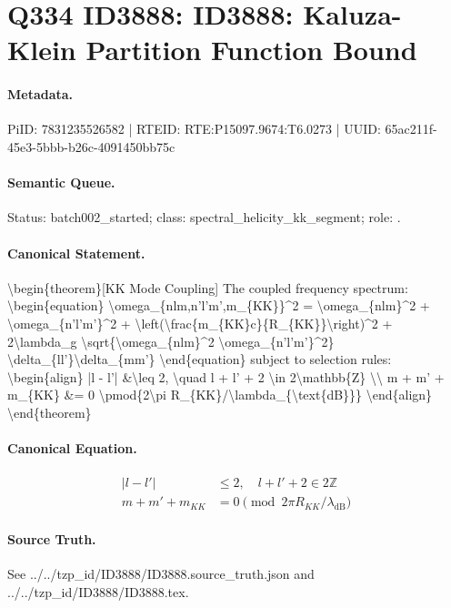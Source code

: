 \section*{Q334 ID3888: ID3888: Kaluza-Klein Partition Function Bound}
\paragraph{Metadata.}
PiID: 7831235526582 | RTEID: RTE:P15097.9674:T6.0273 | UUID: 65ac211f-45e3-5bbb-b26c-4091450bb75c

\paragraph{Semantic Queue.}
Status: batch002\_started; class: spectral\_helicity\_kk\_segment; role: .

\paragraph{Canonical Statement.}
\textbackslash{}begin\{theorem\}[KK Mode Coupling] The coupled frequency spectrum: \textbackslash{}begin\{equation\} \textbackslash{}omega\_\{nlm,n'l'm',m\_\{KK\}\}\textasciicircum{}2 = \textbackslash{}omega\_\{nlm\}\textasciicircum{}2 + \textbackslash{}omega\_\{n'l'm'\}\textasciicircum{}2 + \textbackslash{}left(\textbackslash{}frac\{m\_\{KK\}c\}\{R\_\{KK\}\}\textbackslash{}right)\textasciicircum{}2 + 2\textbackslash{}lambda\_g \textbackslash{}sqrt\{\textbackslash{}omega\_\{nlm\}\textasciicircum{}2 \textbackslash{}omega\_\{n'l'm'\}\textasciicircum{}2\} \textbackslash{}delta\_\{ll'\}\textbackslash{}delta\_\{mm'\} \textbackslash{}end\{equation\} subject to selection rules: \textbackslash{}begin\{align\} |l - l'| \&\textbackslash{}leq 2, \textbackslash{}quad l + l' + 2 \textbackslash{}in 2\textbackslash{}mathbb\{Z\} \textbackslash{}\textbackslash{} m + m' + m\_\{KK\} \&= 0 \textbackslash{}pmod\{2\textbackslash{}pi R\_\{KK\}/\textbackslash{}lambda\_\{\textbackslash{}text\{dB\}\}\} \textbackslash{}end\{align\} \textbackslash{}end\{theorem\}

\paragraph{Canonical Equation.}
\[
\begin{align} |l - l'| &\leq 2, \quad l + l' + 2 \in 2\mathbb{Z} \\ m + m' + m_{KK} &= 0 \pmod{2\pi R_{KK}/\lambda_{\text{dB}}} \end{align}
\]

\paragraph{Source Truth.}
See ../../tzp\_id/ID3888/ID3888.source\_truth.json and ../../tzp\_id/ID3888/ID3888.tex.
